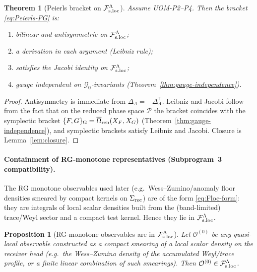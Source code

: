 \documentclass[10pt]{article}
\theoremstyle{definition}
\theoremstyle{plain}
\newtheorem{theorem}{Theorem}[section]
\newtheorem{proposition}{Proposition}[section]
\begin{document}
\begin{theorem}[Peierls bracket on $\mathcal F_{\rm s.loc}^\Lambda$]
\label{thm:Peierls-P5}
Assume UOM-P2--P4.  Then the bracket \eqref{eq:Peierls-FG} is:
\begin{enumerate}[label=\textnormal{(\roman*)},leftmargin=2.0em,itemsep=1pt]
\item bilinear and antisymmetric on $\mathcal F_{\rm s.loc}^\Lambda$;
\item a derivation in each argument (Leibniz rule);
\item satisfies the Jacobi identity on $\mathcal F_{\rm s.loc}^\Lambda$;
\item gauge independent on $\mathcal G_0$-invariants (Theorem~\ref{thm:gauge-independence}).
\end{enumerate}
\end{theorem}

\begin{proof}
Antisymmetry is immediate from $\Delta_\Lambda=-\Delta_\Lambda^\top$.
Leibniz and Jacobi follow from the fact that on the reduced phase space $\mathcal P$ the bracket coincides with the symplectic bracket
$\{F,G\}_\Omega=\overline\Omega_{\rm ren}(X_F,X_G)$ (Theorem~\ref{thm:gauge-independence}), and symplectic brackets satisfy Leibniz and Jacobi.
Closure is Lemma~\ref{lem:closure}.
\end{proof}

\paragraph{Containment of RG-monotone representatives (Subprogram~3 compatibility).}
The RG monotone observables used later (e.g.\ Wess--Zumino/anomaly floor densities smeared by compact kernels on $\Sigma_{\rm rec}$) are of the
form \eqref{eq:Floc-form}: they are integrals of local scalar densities built from the (band-limited) trace/Weyl sector and a compact test
kernel.  Hence they lie in $\mathcal F_{\rm s.loc}^\Lambda$.

\begin{proposition}[RG-monotone observables are in $\mathcal F_{\rm s.loc}^\Lambda$]
\label{prop:RG-observable-in-Floc}
Let $\mathcal O^{(0)}$ be any quasi-local observable constructed as a compact smearing of a local scalar density on the receiver head
(e.g.\ the Wess--Zumino density of the accumulated Weyl/trace profile, or a finite linear combination of such smearings).
Then $\mathcal O^{(0)}\in\mathcal F_{\rm s.loc}^\Lambda$.
\end{proposition}
\end{document}
